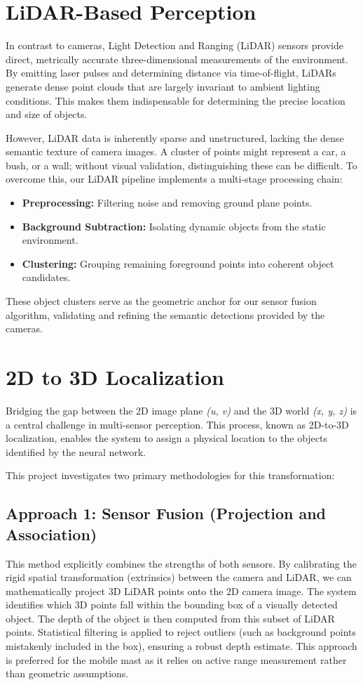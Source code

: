 \documentclass[12pt,a4paper]{report}
\begin{document}
\section{LiDAR-Based Perception}
In contrast to cameras, Light Detection and Ranging (LiDAR) sensors provide direct, metrically accurate three-dimensional measurements of the environment. By emitting laser pulses and determining distance via time-of-flight, LiDARs generate dense point clouds that are largely invariant to ambient lighting conditions. This makes them indispensable for determining the precise location and size of objects.

However, LiDAR data is inherently sparse and unstructured, lacking the dense semantic texture of camera images. A cluster of points might represent a car, a bush, or a wall; without visual validation, distinguishing these can be difficult. To overcome this, our LiDAR pipeline implements a multi-stage processing chain:
\begin{itemize}
    \item \textbf{Preprocessing:} Filtering noise and removing ground plane points.
    \item \textbf{Background Subtraction:} Isolating dynamic objects from the static environment.
    \item \textbf{Clustering:} Grouping remaining foreground points into coherent object candidates.
\end{itemize}
These object clusters serve as the geometric anchor for our sensor fusion algorithm, validating and refining the semantic detections provided by the cameras.

\section{2D to 3D Localization}
Bridging the gap between the 2D image plane \textit{(u, v)} and the 3D world \textit{(x, y, z)} is a central challenge in multi-sensor perception. This process, known as 2D-to-3D localization, enables the system to assign a physical location to the objects identified by the neural network.

This project investigates two primary methodologies for this transformation:

\subsection{Approach 1: Sensor Fusion (Projection and Association)}
This method explicitly combines the strengths of both sensors. By calibrating the rigid spatial transformation (extrinsics) between the camera and LiDAR, we can mathematically project 3D LiDAR points onto the 2D camera image.
The system identifies which 3D points fall within the bounding box of a visually detected object. The depth of the object is then computed from this subset of LiDAR points. Statistical filtering is applied to reject outliers (such as background points mistakenly included in the box), ensuring a robust depth estimate. This approach is preferred for the mobile mast as it relies on active range measurement rather than geometric assumptions.
\end{document}
